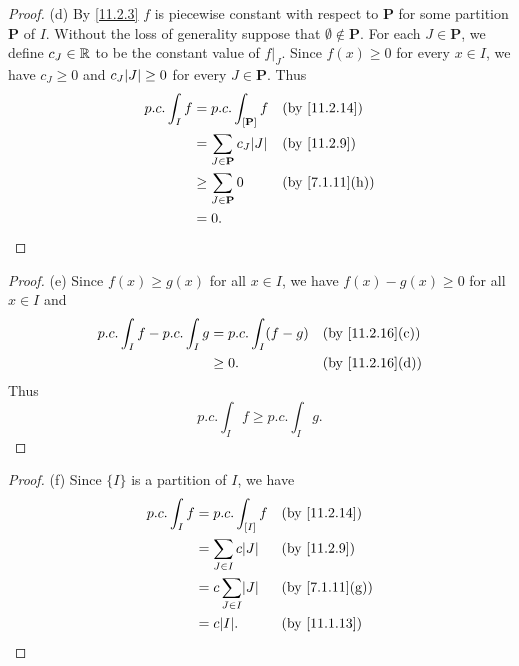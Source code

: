 \begin{proof}{(d)}
  By \cref{11.2.3} \(f\) is piecewise constant with respect to \(\mathbf{P}\) for some partition \(\mathbf{P}\) of \(I\).
  Without the loss of generality suppose that \(\emptyset \notin \mathbf{P}\).
  For each \(J \in \mathbf{P}\), we define \(c_J \in \mathbb{R}\) to be the constant value of \(f|_J\).
  Since \(f(x) \geq 0\) for every \(x \in I\), we have \(c_J \geq 0\) and \(c_J \abs{J} \geq 0\) for every \(J \in \mathbf{P}\).
  Thus
  \begin{align*}
    p.c. \int_I f & = p.c. \int_{[\mathbf{P}]} f          &  & \text{(by \cref{11.2.14})}   \\
                  & = \sum_{J \in \mathbf{P}} c_J \abs{J} &  & \text{(by \cref{11.2.9})}    \\
                  & \geq \sum_{J \in \mathbf{P}} 0        &  & \text{(by \cref{7.1.11}(h))} \\
                  & = 0.
  \end{align*}
\end{proof}

\begin{proof}{(e)}
  Since \(f(x) \geq g(x)\) for all \(x \in I\), we have \(f(x) - g(x) \geq 0\) for all \(x \in I\) and
  \begin{align*}
    p.c. \int_I f - p.c. \int_I g & = p.c. \int_I (f - g) &  & \text{(by \cref{11.2.16}(c))} \\
                                  & \geq 0.               &  & \text{(by \cref{11.2.16}(d))}
  \end{align*}
  Thus
  \[
    p.c. \int_I f \geq p.c. \int_I g.
  \]
\end{proof}

\begin{proof}{(f)}
  Since \(\{I\}\) is a partition of \(I\), we have
  \begin{align*}
    p.c. \int_I f & = p.c. \int_{[I]} f        &  & \text{(by \cref{11.2.14})}   \\
                  & = \sum_{J \in I} c \abs{J} &  & \text{(by \cref{11.2.9})}    \\
                  & = c \sum_{J \in I} \abs{J} &  & \text{(by \cref{7.1.11}(g))} \\
                  & = c \abs{I}.               &  & \text{(by \cref{11.1.13})}
  \end{align*}
\end{proof}

